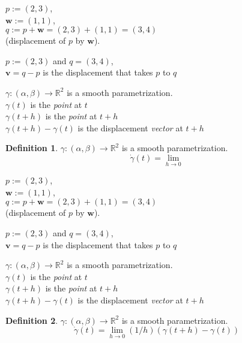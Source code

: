 \documentclass[twocolumn,20pt,fleqn]{extarticle}
\newcommand{\sep}{\vspace{0.5cm}}
\theoremstyle{plain}
\theoremstyle{definition}
\newtheorem*{definition}{Definition}
\theoremstyle{remark}
\begin{document}
$p := (2,3)$,\\ $\mathbf{w} := (1,1)$,\\ $q:=p + \mathbf{w} = (2,3) + (1,1) = (3,4)$ \\ (displacement of $p$ by $\mathbf{w}$).

\sep
$p := (2,3)$ and $q=(3,4)$,\\
$\mathbf{v}= q - p$ is the displacement that takes $p$ to $q$ 
\sep

$\gamma : (\alpha,\beta) \to \mathbb{R}^2$ is a smooth parametrization.\\
$\gamma(t)$ is the \emph{point} at $t$\\
$\gamma(t+h)$ is the \emph{point} at $t+h$\\
$\gamma(t+h)-\gamma(t)$ is the displacement \emph{vector} at $t+h$\\



\begin{definition}
$\gamma : (\alpha,\beta) \to \mathbb{R}^2$ is a smooth parametrization.
\[\dot{\gamma}(t) = \lim_{h\to 0} \]\end{definition}


\clearpage



$p := (2,3)$,\\ $\mathbf{w} := (1,1)$,\\ $q:=p + \mathbf{w} = (2,3) + (1,1) = (3,4)$ \\ (displacement of $p$ by $\mathbf{w}$).

\sep
$p := (2,3)$ and $q=(3,4)$,\\
$\mathbf{v}= q - p$ is the displacement that takes $p$ to $q$ 
\sep

$\gamma : (\alpha,\beta) \to \mathbb{R}^2$ is a smooth parametrization.\\
$\gamma(t)$ is the \emph{point} at $t$\\
$\gamma(t+h)$ is the \emph{point} at $t+h$\\
$\gamma(t+h)-\gamma(t)$ is the displacement \emph{vector} at $t+h$\\



\begin{definition}
$\gamma : (\alpha,\beta) \to \mathbb{R}^2$ is a smooth parametrization.
\[\dot{\gamma}(t) = \lim_{h\to 0} (1/h)(\gamma(t+h) - \gamma(t))\]
\end{definition}


\clearpage
\end{document}
